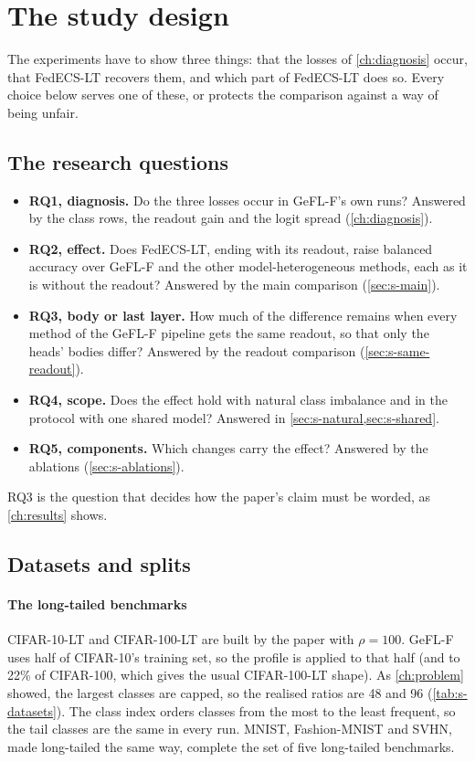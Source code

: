 \section{The study design}\label{ch:design}

The experiments have to show three things: that the losses of \cref{ch:diagnosis} occur, that FedECS-LT recovers
them, and which part of FedECS-LT does so. Every choice below serves one of these, or protects the comparison against
a way of being unfair.

\subsection{The research questions}\label{sec:s-rq}

\begin{itemize}
\item \textbf{RQ1, diagnosis.} Do the three losses occur in GeFL-F's own runs? Answered by the class rows, the readout
gain and the logit spread (\cref{ch:diagnosis}).
\item \textbf{RQ2, effect.} Does FedECS-LT, ending with its readout, raise balanced accuracy over GeFL-F and the other
model-heterogeneous methods, each as it is without the readout? Answered by the main comparison (\cref{sec:s-main}).
\item \textbf{RQ3, body or last layer.} How much of the difference remains when every method of the GeFL-F pipeline
gets the same readout, so that only the heads' bodies differ? Answered by the readout comparison
(\cref{sec:s-same-readout}).
\item \textbf{RQ4, scope.} Does the effect hold with natural class imbalance and in the protocol with one shared
model? Answered in \cref{sec:s-natural,sec:s-shared}.
\item \textbf{RQ5, components.} Which changes carry the effect? Answered by the ablations
(\cref{sec:s-ablations}).
\end{itemize}
RQ3 is the question that decides how the paper's claim must be worded, as \cref{ch:results} shows.

\subsection{Datasets and splits}

\paragraph{The long-tailed benchmarks} CIFAR-10-LT and CIFAR-100-LT are built by the paper with $\rho=100$. GeFL-F
uses half of CIFAR-10's training set, so the profile is applied to that half (and to 22\% of CIFAR-100, which gives the
usual CIFAR-100-LT shape). As \cref{ch:problem} showed, the largest classes are capped, so the realised ratios are 48
and 96 (\cref{tab:s-datasets}). The class index orders classes from the most to the least frequent, so the tail
classes are the same in every run. MNIST, Fashion-MNIST and SVHN, made long-tailed the same way, complete the set of five
long-tailed benchmarks.

